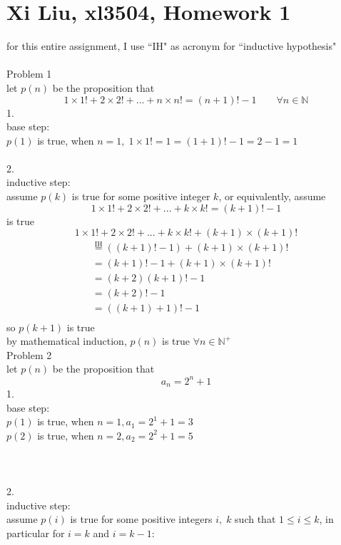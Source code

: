 \documentclass[12pt,border=4pt,multi]{article}%
\begin{document}
\section*{Xi Liu, xl3504, Homework 1}
for this entire assignment, I use ``IH" as acronym for ``inductive hypothesis"\\
\\
Problem 1\\
let $p(n)$ be the proposition that 
\[1 \times 1! + 2 \times 2! + ... + n \times n! = (n + 1)! - 1 \qquad \forall n \in \mathbb{N}\]
1.\\ 
base step:\\
$p(1)$ is true, when $n = 1, \; 1 \times 1! = 1 = (1 + 1)! - 1 = 2 - 1 = 1$\\
\\
2.\\
inductive step:\\
assume $p(k)$ is true for some positive integer $k$, or equivalently, assume 
\[1 \times 1! + 2 \times 2! + ... + k \times k! = (k + 1)! - 1\]
is true
\[1 \times 1! + 2 \times 2! + ... + k \times k! + (k + 1) \times (k + 1)!\]
\begin{align*}
    &\stackrel{\text{IH}}{=} ((k + 1)! - 1) + (k + 1) \times (k + 1)!\\
    &= (k + 1)! - 1 + (k + 1) \times (k + 1)!\\
    &= (k + 2)(k + 1)! - 1\\
    &= (k + 2)! - 1\\
    &= ((k + 1) + 1)! - 1\\
\end{align*}
so $p(k + 1)$ is true\\
by mathematical induction, $p(n)$ is true $\forall n \in \mathbb{N}^+$\\
\newpage 
\noindent
Problem 2\\
let $p(n)$ be the proposition that 
\[a_n = 2^n + 1\]
1.\\
base step:\\
$p(1)$ is true, when $n = 1, a_1 = 2^1 + 1 = 3$\\
$p(2)$ is true, when $n = 2, a_2 = 2^2 + 1 = 5$\\
\\
\\
\\
2.\\
inductive step:\\
assume $p(i)$ is true for some positive integers $i,\;k$ such that $1 \leq i \leq k$, in particular for $i = k$ and $i = k - 1$:\\
\end{document}
